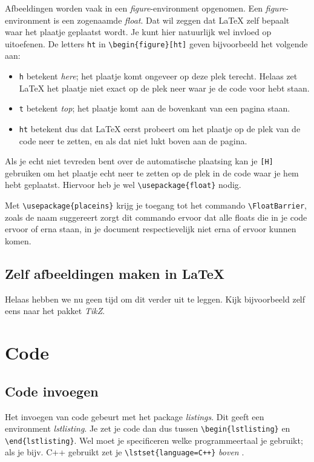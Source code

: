 Afbeeldingen worden vaak in een \emph{figure}-environment opgenomen. Een
\emph{figure}-environment is een zogenaamde \emph{float}. Dat wil zeggen dat
\LaTeX{} zelf bepaalt waar het plaatje geplaatst wordt. Je kunt hier natuurlijk
wel invloed op uitoefenen. De letters \verb|ht| in \verb+\begin{figure}[ht]+
geven bijvoorbeeld het volgende aan:
\begin{itemize}
	\item \verb+h+ betekent \emph{here}; het plaatje komt ongeveer op deze plek
terecht. Helaas zet \LaTeX{} het plaatje niet exact op de plek neer waar je de
code voor hebt staan.
	\item \verb+t+ betekent \emph{top}; het plaatje komt aan de bovenkant van
	een pagina staan.
	\item \verb+ht+ betekent dus dat \LaTeX{} eerst probeert om het plaatje op
	de plek van de code neer te zetten, en als dat niet lukt boven aan de
	pagina.
\end{itemize}
Als je echt niet tevreden bent over de automatische plaatsing kan je \verb+[H]+
gebruiken om het plaatje echt neer te zetten op de plek in de code waar je hem
hebt geplaatst. Hiervoor heb je wel \verb&\usepackage{float}& nodig. 

Met \verb&\usepackage{placeins}& krijg je toegang tot het commando \verb&\FloatBarrier&, zoals de naam suggereert zorgt dit commando ervoor dat alle floats die in je code ervoor of erna staan, in je document respectievelijk niet erna of ervoor kunnen komen.

\subsection{Zelf afbeeldingen maken in \LaTeX}
Helaas hebben we nu geen tijd om dit verder uit te leggen. Kijk bijvoorbeeld
zelf eens naar het pakket \emph{TikZ}.



\section{Code}

\subsection{Code invoegen}

Het invoegen van code gebeurt met het package \textit{listings}. Dit geeft een
environment \emph{lstlisting}. Je zet je code dan dus tussen
\verb+\begin{lstlisting}+ en \verb+\end{lstlisting}+. Wel moet je specificeren
welke programmeertaal je gebruikt; als je bijv. C++ gebruikt zet je
\verb|\lstset{language=C++}| \emph{boven} \verb++.

